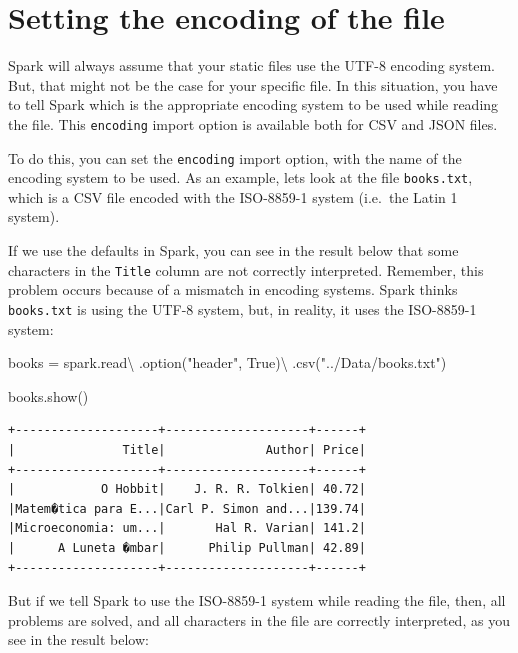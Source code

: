 \documentclass[
  11pt,
  letterpaper,
  DIV=11,
  numbers=noendperiod]{scrreprt}
\newenvironment{Shaded}{\begin{snugshade}}{\end{snugshade}}
\newcommand{\NormalTok}[1]{\textcolor[rgb]{0.00,0.23,0.31}{#1}}
\newcommand{\OperatorTok}[1]{\textcolor[rgb]{0.37,0.37,0.37}{#1}}
\newcommand{\StringTok}[1]{\textcolor[rgb]{0.13,0.47,0.30}{#1}}
\newcommand{\VariableTok}[1]{\textcolor[rgb]{0.07,0.07,0.07}{#1}}
\begin{document}
\hypertarget{setting-the-encoding-of-the-file}{%
\section{Setting the encoding of the
file}\label{setting-the-encoding-of-the-file}}

Spark will always assume that your static files use the UTF-8 encoding
system. But, that might not be the case for your specific file. In this
situation, you have to tell Spark which is the appropriate encoding
system to be used while reading the file. This \texttt{encoding} import
option is available both for CSV and JSON files.

To do this, you can set the \texttt{encoding} import option, with the
name of the encoding system to be used. As an example, lets look at the
file \texttt{books.txt}, which is a CSV file encoded with the ISO-8859-1
system (i.e.~the Latin 1 system).

If we use the defaults in Spark, you can see in the result below that
some characters in the \texttt{Title} column are not correctly
interpreted. Remember, this problem occurs because of a mismatch in
encoding systems. Spark thinks \texttt{books.txt} is using the UTF-8
system, but, in reality, it uses the ISO-8859-1 system:

\begin{Shaded}
\begin{Highlighting}[]
\NormalTok{books }\OperatorTok{=}\NormalTok{ spark.read}\OperatorTok{\textbackslash{}}
\NormalTok{  .option(}\StringTok{"header"}\NormalTok{, }\VariableTok{True}\NormalTok{)}\OperatorTok{\textbackslash{}}
\NormalTok{  .csv(}\StringTok{"../Data/books.txt"}\NormalTok{)}
  
\NormalTok{books.show()}
\end{Highlighting}
\end{Shaded}

\begin{verbatim}
+--------------------+--------------------+------+
|               Title|              Author| Price|
+--------------------+--------------------+------+
|            O Hobbit|    J. R. R. Tolkien| 40.72|
|Matem�tica para E...|Carl P. Simon and...|139.74|
|Microeconomia: um...|       Hal R. Varian| 141.2|
|      A Luneta �mbar|      Philip Pullman| 42.89|
+--------------------+--------------------+------+
\end{verbatim}

But if we tell Spark to use the ISO-8859-1 system while reading the
file, then, all problems are solved, and all characters in the file are
correctly interpreted, as you see in the result below:
\end{document}

